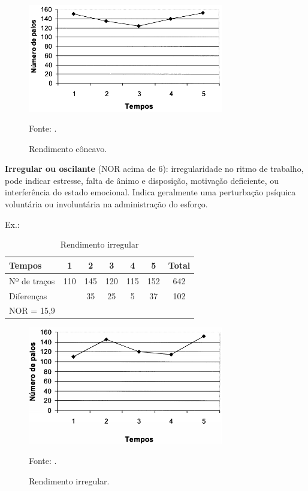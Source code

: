 \begin{figure}[H]
 \centering
 \includegraphics[width=0.76\textwidth]{./fig/grafico-rendimento/concavo}
 \caption{Rendimento côncavo.}
  Fonte: \cite{psicohood2018}.
 \label{fig:concavo}
\end{figure}

\textbf{Irregular ou oscilante }(NOR acima de 6): irregularidade no ritmo de trabalho, pode indicar estresse, falta de ânimo e disposição, motivação deficiente, ou interferência do estado emocional. Indica geralmente uma perturbação psíquica voluntária ou involuntária na administração do esforço.

Ex.:
\begin{table}[h]
\centering
\caption{Rendimento irregular\cite{psicohood2018} }
\label{tab:irregular} 

\begin{tabular}{|l|c|c|c|c|c|c|}
\hline Tempos       & 1     & 2     & 3    &  4     & 5     & Total \\ 
\hline Nº de traços & 110 & 145 & 120 & 115 & 152 & 642 \\ 
\hline    \multicolumn{2}{|l|}{ Diferenças}& 35   & 25    &5     & 37    & 102\\ 
\hline NOR = 15,9\\
\cline{1-11}
\end{tabular} 

\end{table}

\begin{figure}[H]
 \centering
 \includegraphics[width=0.76\textwidth]{./fig/grafico-rendimento/irregular}
 \caption{Rendimento irregular.}
  Fonte: \cite{psicohood2018}.
 \label{fig:irregular}
\end{figure}



